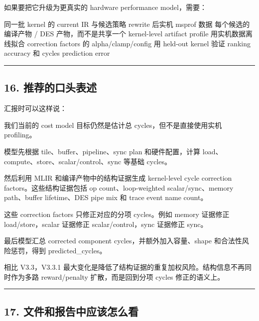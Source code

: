 \documentclass[
  10pt,
]{article}
\newenvironment{Shaded}{}{}
\newcommand{\NormalTok}[1]{#1}
\begin{document}
如果要把它升级为更真实的 hardware performance model，需要：

\begin{Shaded}
\begin{Highlighting}[]
\NormalTok{同一批 kernel 的 current IR 与候选策略 rewrite 后实机 msprof 数据}
\NormalTok{每个候选的编译产物 / DES 产物，而不是共享一个 kernel{-}level artifact profile}
\NormalTok{用实机数据离线拟合 correction factors 的 alpha/clamp/config}
\NormalTok{用 held{-}out kernel 验证 ranking accuracy 和 cycles prediction error}
\end{Highlighting}
\end{Shaded}

\begin{center}\rule{0.5\linewidth}{0.5pt}\end{center}

\subsection{16.
推荐的口头表述}\label{ux63a8ux8350ux7684ux53e3ux5934ux8868ux8ff0}

汇报时可以这样说：

我们当前的 cost model 目标仍然是估计总 cycles，但不是直接使用实机
profiling。

模型先根据 tile、buffer、pipeline、sync plan 和硬件配置，计算
load、compute、store、scalar/control、sync 等基础 cycles。

然后利用 MLIR 和编译产物中的结构证据生成 kernel-level cycle correction
factors。这些结构证据包括 op count、loop-weighted scalar/sync、memory
path、buffer lifetime、DES pipe mix 和 trace event name count。

这些 correction factors 只修正对应的分项 cycles。例如 memory 证据修正
load/store，scalar 证据修正 scalar/control，sync 证据修正 sync。

最后模型汇总 corrected component cycles，并额外加入容量、shape
和合法性风险惩罚，得到 predicted\_cycles。

相比 V3.3，V3.3.1
最大变化是降低了结构证据的重复加权风险。结构信息不再同时作为多路
reward/penalty 扩散，而是回到分项 cycles 修正的语义上。

\begin{center}\rule{0.5\linewidth}{0.5pt}\end{center}

\subsection{17.
文件和报告中应该怎么看}\label{ux6587ux4ef6ux548cux62a5ux544aux4e2dux5e94ux8be5ux600eux4e48ux770b}
\end{document}
